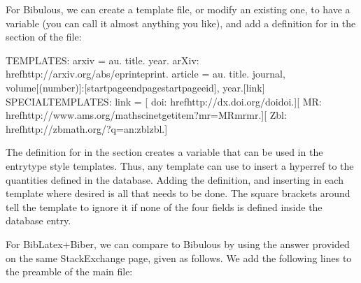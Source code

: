 \documentclass[letterpaper,10pt,english]{sphinxmanual}
\begin{document}
For Bibulous, we can create a template file, or modify an existing one, to have a  variable (you can call it almost anything you like), and add a definition for  in the  section of the file:

%
\begin{sphinxVerbatim}[commandchars=\\\{\}]
TEMPLATES:
arxiv = \PYGZlt{}au\PYGZgt{}. \PYGZlt{}title\PYGZgt{}. \PYGZlt{}year\PYGZgt{}. arXiv: \PYGZbs{}href\PYGZob{}http://arxiv.org/abs/\PYGZlt{}eprint\PYGZgt{}\PYGZcb{}\PYGZob{}\PYGZlt{}eprint\PYGZgt{}\PYGZcb{}.
article = \PYGZlt{}au\PYGZgt{}. \PYGZlt{}title\PYGZgt{}. \PYGZlt{}journal\PYGZgt{}, \PYGZlt{}volume\PYGZgt{}[(\PYGZlt{}number\PYGZgt{})]:[\PYGZlt{}startpage\PYGZgt{}\PYGZhy{}\PYGZhy{}\PYGZlt{}endpage\PYGZgt{}\textbar{}\PYGZlt{}startpage\PYGZgt{}\textbar{}\PYGZlt{}eid\PYGZgt{}\textbar{}], \PYGZlt{}year\PYGZgt{}.[\PYGZlt{}link\PYGZgt{}]
SPECIAL\PYGZhy{}TEMPLATES:
link = [ doi: \PYGZbs{}href\PYGZob{}http://dx.doi.org/\PYGZlt{}doi\PYGZgt{}\PYGZcb{}\PYGZob{}\PYGZlt{}doi\PYGZgt{}\PYGZcb{}.][ MR: \PYGZbs{}href\PYGZob{}http://www.ams.org/mathscinet\PYGZhy{}getitem?mr=MR\PYGZlt{}mr\PYGZgt{}\PYGZcb{}\PYGZob{}\PYGZlt{}mr\PYGZgt{}\PYGZcb{}.][ Zbl: \PYGZbs{}href\PYGZob{}http://zbmath.org/?q=an:\PYGZlt{}zbl\PYGZgt{}\PYGZcb{}\PYGZob{}\PYGZlt{}zbl\PYGZgt{}\PYGZcb{}.]
\end{sphinxVerbatim}

The definition for  in the  section creates a variable that can be used in the entrytype style templates. Thus, any template can use  to insert a hyperref to the quantities defined in the database. Adding the definition, and inserting  in each template where desired is all that needs to be done. The square brackets around  tell the template to ignore it if none of the four fields is defined inside the database entry.

For BibLatex+Biber, we can compare to Bibulous by using the answer provided on the same StackExchange page, given as follows. We add the following lines to the preamble of the main  file:
\end{document}
